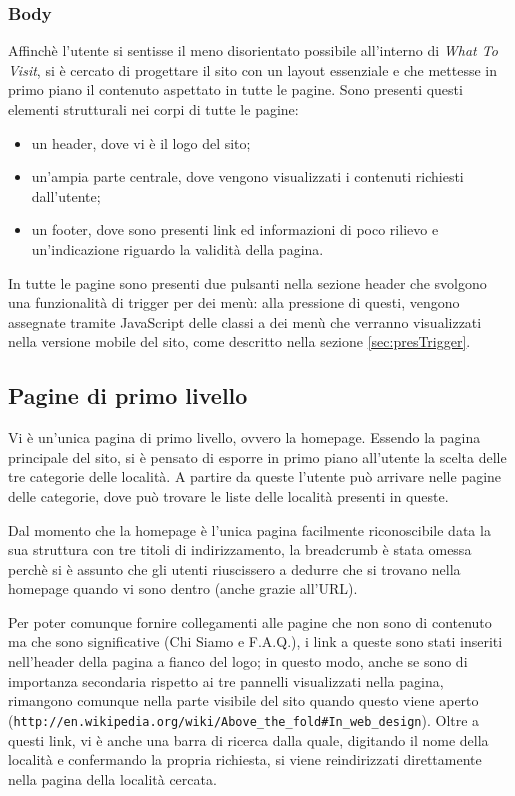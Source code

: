 \subsubsection{Body}
Affinchè l'utente si sentisse il meno disorientato possibile all'interno di \textit{What To Visit}, si è cercato di progettare il sito con un layout essenziale e che mettesse in primo piano il contenuto aspettato in tutte le pagine.
Sono presenti questi elementi strutturali nei corpi di tutte le pagine:
\begin{itemize}
\item un header, dove vi è il logo del sito;
\item un'ampia parte centrale, dove vengono visualizzati i contenuti richiesti dall'utente;
\item un footer, dove sono presenti link ed informazioni di poco rilievo e un'indicazione riguardo la validità della pagina.
\end{itemize}

In tutte le pagine sono presenti due pulsanti nella sezione header che
svolgono una funzionalità di trigger per dei menù: alla pressione di questi,
vengono assegnate tramite JavaScript delle classi a dei menù che verranno
visualizzati nella versione mobile del sito, come descritto nella sezione
\ref{sec:presTrigger}.

\subsection{Pagine di primo livello}
Vi è un'unica pagina di primo livello, ovvero la homepage.
Essendo la pagina principale del sito, si è pensato di esporre in primo piano all'utente la scelta delle tre categorie delle località.
A partire da queste l'utente può arrivare nelle pagine delle categorie, dove può trovare le liste delle località presenti in queste.

Dal momento che la homepage è l'unica pagina facilmente riconoscibile data la sua struttura con tre titoli di indirizzamento, la breadcrumb è stata omessa perchè si è assunto che gli utenti riuscissero a dedurre che si trovano nella homepage quando vi sono dentro (anche grazie all'URL).

Per poter comunque fornire collegamenti alle pagine che non sono di contenuto ma che sono significative (Chi Siamo e F.A.Q.), i link a queste sono stati inseriti nell'header della pagina a fianco del logo; in questo modo, anche se sono di importanza secondaria rispetto ai tre pannelli visualizzati nella pagina, rimangono comunque nella parte visibile del sito quando questo viene aperto (\texttt{http://en.wikipedia.org/wiki/Above\_the\_fold\#In\_web\_design}). Oltre a questi link, vi è anche una barra di ricerca dalla quale, digitando il nome della località e confermando la propria richiesta, si viene reindirizzati direttamente nella pagina della località cercata.

